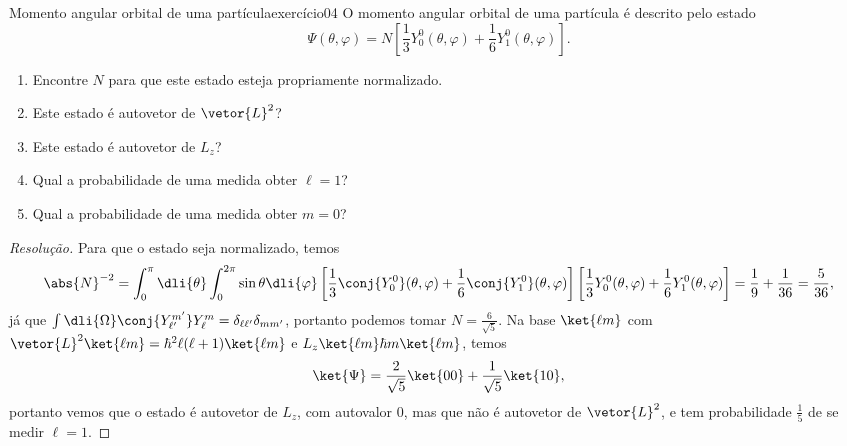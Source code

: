 \begin{exercício}{Momento angular orbital de uma partícula}{exercício04}
    O momento angular orbital de uma partícula é descrito pelo estado
    \begin{equation*}
        \Psi(\theta,\varphi) = N\left[\frac{1}{3}Y_0^0(\theta,\varphi) + \frac16 Y_{1}^0 (\theta, \varphi)\right].
    \end{equation*}
    \begin{enumerate}[label=(\alph*)]
        \item Encontre \(N\) para que este estado esteja propriamente normalizado.
        \item Este estado é autovetor de \(\vetor{L}^2\)?
        \item Este estado é autovetor de \(L_z\)?
        \item Qual a probabilidade de uma medida obter \(\ell = 1\)?
        \item Qual a probabilidade de uma medida obter \(m = 0\)?
    \end{enumerate}
\end{exercício}
\begin{proof}[Resolução]
    Para que o estado seja normalizado, temos
    \begin{equation*}
        \abs{N}^{-2} = \int_0^\pi \dli{\theta}\int_0^{2\pi} \sin\theta \dli{\varphi} \left[\frac{1}{3}\conj{Y_0^0}(\theta,\varphi) + \frac16 \conj{Y_{1}^0}(\theta, \varphi)\right]\left[\frac{1}{3}Y_0^0(\theta,\varphi) + \frac16 Y_{1}^0 (\theta, \varphi)\right]= \frac19 + \frac1{36} = \frac{5}{36},
    \end{equation*}
    já que \(\int \dli{\Omega} \conj{Y_{\ell'}^{m'}} Y_\ell^m = \delta_{\ell \ell'} \delta_{m m'}\), portanto podemos tomar \(N = \frac{6}{\sqrt{5}}\). Na base \(\ket{\ell m}\) com \(\vetor{L}^2 \ket{\ell m} = \hbar^2 \ell (\ell + 1) \ket{\ell m}\) e \(L_z \ket{\ell m} \hbar m \ket{\ell m}\), temos
    \begin{equation*}
        \ket{\Psi} = \frac{2}{\sqrt{5}}\ket{00} + \frac1{\sqrt{5}} \ket{10},
    \end{equation*}
    portanto vemos que o estado é autovetor de \(L_z\), com autovalor \(0\), mas que não é autovetor de \(\vetor{L}^2\), e tem probabilidade \(\frac15\) de se medir \(\ell = 1\).
\end{proof}
